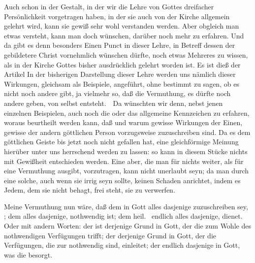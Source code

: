 \begin{aufza}
\item Auch schon in der Gestalt, in der wir die Lehre von Gottes dreifacher Persönlichkeit vorgetragen haben, in der sie auch von der Kirche allgemein gelehrt wird, kann sie gewiß sehr wohl verstanden werden. Aber obgleich man etwas versteht, kann man doch wünschen, darüber noch mehr zu erfahren. Und da gibt es denn besonders Einen Punct in dieser Lehre, in Betreff dessen der gebildetere Christ vornehmlich wünschen dürfte, noch etwas Mehreres zu wissen, als in der Kirche Gottes bisher ausdrücklich gelehrt worden ist. Es ist dieß der Artikel  In der bisherigen Darstellung dieser Lehre werden uns nämlich  dieser Wirkungen, gleichsam als Beispiele, angeführt, ohne bestimmt zu sagen, ob es nicht noch andere gibt, ja vielmehr so, daß die Vermuthung, es dürfte noch andere geben, von selbst entsteht.~\ Da wünschten wir denn, nebst jenen einzelnen Beispielen, auch noch die  oder das allgemeine Kennzeichen zu erfahren, woraus beurtheilt werden kann, daß und warum gewisse Wirkungen der Einen, gewisse der andern göttlichen Person vorzugsweise zuzuschreiben sind. Da es dem göttlichen Geiste bis jetzt noch nicht gefallen hat, eine gleichförmige Meinung hierüber unter uns herrschend werden zu lassen: so kann in diesem Stücke nichts mit Gewißheit entschieden werden. Eine  aber, die man für nichts weiter, als für eine Vermuthung ausgibt, vorzutragen, kann nicht unerlaubt seyn; da man durch eine solche, auch wenn sie irrig seyn sollte, keinen Schaden anrichtet, indem es Jedem, dem sie nicht behagt, frei steht, sie zu verwerfen.
\item Meine Vermuthung nun wäre, daß dem  in Gott alles dasjenige zuzuschreiben sey, ; dem  alles dasjenige,  nothwendig ist; dem heil.\  endlich alles dasjenige,  dienet. Oder mit andern Worten: der  ist derjenige Grund in Gott, der die zum Wohle des  nothwendigen Verfügungen trifft; der  derjenige Grund in Gott, der die Verfügungen, die zur  nothwendig sind, einleitet; der  endlich dasjenige in Gott, was die  besorgt.

\end{aufza}
